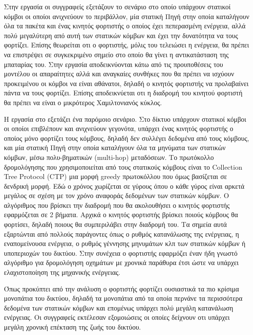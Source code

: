 Στην εργασία \cite{immortal_wsns} οι συγγραφείς εξετάζουν το σενάριο στο οποίο υπάρχουν στατικοί κόμβοι οι οποίοι ανιχνεύουν το περιβάλλον, μία στατική Πηγή στην
οποία καταλήγουν όλα τα πακέτα και ένας κινητός φορτιστής ο οποίος έχει πεπερασμένη ενέργεια, αλλά πολύ μεγαλύτερη από αυτή των στατικών κόμβων και έχει την
δυνατότητα να τους φορτίζει. Επίσης θεωρείται οτι ο φορτιστής, μόλις του τελειώσει η ενέργεια, θα πρέπει να επιστρέψει σε συγκεκριμένο σημείο στο οποίο θα γίνει η
αντικατάσταση της μπαταρίας του. Στην εργασία αποδεικνύονται κάτω από τις προυποθέσεις του μοντέλου οι απαραίτητες αλλά και αναγκαίες συνθήκες που θα πρέπει να
ισχύουν προκειμένου οι κόμβοι να είναι αθάνατοι, δηλαδή ο κινητός φορτιστής να προλαβαίνει πάντα να τους φορτίζει. Επίσης αποδεικνύεται οτι η διαδρομή του κινητού
φορτιστή θα πρέπει να είναι ο μικρότερος Χαμιλτονιανός κύκλος.

Η εργασία στο \cite{j-roc} εξετάζει ένα παρόμοιο σενάριο. Στο δίκτυο υπάρχουν στατικοί κόμβοι οι οποίοι επιβλέπουν και ανιχνεύουν γεγονότα, υπάρχει ένας κινητός
φορτιστής ο οποίος μόνο φορτίζει τους κόμβους, δηλαδή δεν συλλέγει δεδομένα από τους κόμβους, και μία στατική Πηγή στην οποία καταλήγουν όλα τα μηνύματα των στατικών
κόμβων, μέσω πολυ-βηματικών (multi-hop) μεταδόσεων. Το πρωτόκολλο δρομολόγησης που χρησιμοποιείται από τους στατικούς κόμβους είναι το Collection Tree Protocol (CTP)
μια μορφή greedy πρωτοκόλλου που όμως βασίζεται σε δενδρική μορφή. Εδώ ο χρόνος χωρίζεται σε γύρους όπου ο κάθε γύρος είναι αρκετά μεγάλος σε σχέση με τον χρόνο
αναφοράς δεδομένων των στατικών κόμβων. Ο αλγόριθμος που βρίσκει την διαδρομή που θα ακολουθήσει ο κινητός φορτιστής εφαρμόζεται σε 2 βήματα. Αρχικά ο κινητός
φορτιστής βρίσκει ποιούς κόμβους θα φορτίσει, δηλαδή ποιους θα συμπεριλάβει στην διαδρομή του. Τα σημεία αυτά εξαρτώνται από πολλούς παράγοντες όπως ο ρυθμός
κατανάλωσης της ενέργειας, η εναπομείνουσα ενέργεια, ο ρυθμός γέννησης μηνυμάτων κλπ των στατικών κόμβων ή υποπεριοχών του δικτύου. Στην συνέχεια ο φορτιστής
εφαρμόζει έναν ήδη γνωστό αλγόριθμο \cite{VRPTW_solver} για δρομολόγηση οχημάτων με χρονικά παράθυρα έτσι ώστε να υπάρχει ελαχιστοποίηση της μηχανικής ενέργειας.

Όπως προκύπτει από την ανάλυση ο φορτιστής φορτίζει ουσιαστικά τα πιο κρίσιμα μονοπάτια του δικτύου, δηλαδή τα μονοπάτια από τα οποία περνάνε τα περισσότερα δεδομένα
των στατικών κόμβων και επομένως υπάρχει πολύ μεγάλη κατανάλωση ενέργειας. Οι συγγραφείς εκτέλεσαν εξομοιώσεις οι οποίες δείχνουν οτι υπάρχει μεγάλη χρονική επέκταση
της ζωής του δικτύου.


